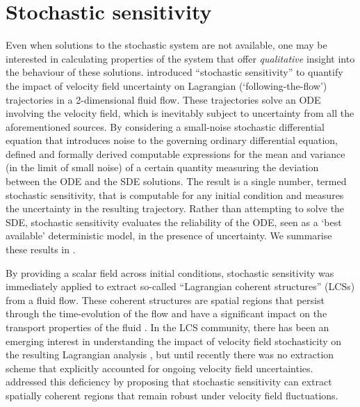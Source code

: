 \section{Stochastic sensitivity}
Even when solutions to the stochastic system are not available, one may be interested in calculating properties of the system that offer \emph{qualitative} insight into the behaviour of these solutions.
\citet{Balasuriya_2020_StochasticSensitivityComputable} introduced ``stochastic sensitivity'' to quantify the impact of velocity field uncertainty on Lagrangian (`following-the-flow') trajectories in a 2-dimensional fluid flow.
These trajectories solve an ODE involving the velocity field, which is inevitably subject to uncertainty from all the aforementioned sources.
By considering a small-noise stochastic differential equation that introduces noise to the governing ordinary differential equation, \citet{Balasuriya_2020_StochasticSensitivityComputable} defined and formally derived computable expressions for the mean and variance (in the limit of small noise) of a certain quantity measuring the deviation between the ODE and the SDE solutions.
The result is a single number, termed stochastic sensitivity, that is computable for any initial condition and measures the uncertainty in the resulting trajectory.
Rather than attempting to solve the SDE, stochastic sensitivity evaluates the reliability of the ODE, seen as a `best available' deterministic model, in the presence of uncertainty.
We summarise these results in .

By providing a scalar field across initial conditions, stochastic sensitivity was immediately applied to extract so-called ``Lagrangian coherent structures'' (LCSs) from a fluid flow.
These coherent structures are spatial regions that persist through the time-evolution of the flow and have a significant impact on the transport properties of the fluid \citep{BalasuriyaEtAl_2018_GeneralizedLagrangianCoherent,HadjighasemEtAl_2017_CriticalComparisonLagrangian,PeacockDabiri_2010_IntroductionFocusIssue}.
In the LCS community, there has been an emerging interest in understanding the impact of velocity field stochasticity on the resulting Lagrangian analysis \citep{DennerEtAl_2016_ComputingCoherentSets,YouLeung_2021_ComputingFiniteTime,Balasuriya_2020_StochasticApproachesLagrangian,HallerEtAl_2018_MaterialBarriersDiffusive,BalasuriyaGottwald_2018_EstimatingStableUnstable,Balasuriya_2017_StochasticUncertaintyAdvected,KaszasHaller_2020_UniversalUpperEstimate}, but until recently there was no extraction scheme that explicitly accounted for ongoing velocity field uncertainties.
\citet{Balasuriya_2020_StochasticSensitivityComputable} addressed this deficiency by proposing that stochastic sensitivity can extract spatially coherent regions that remain robust under velocity field fluctuations.

